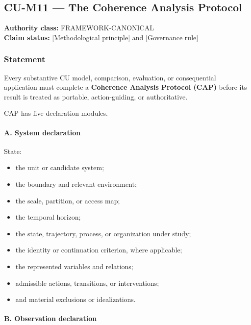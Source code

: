 \documentclass[
  11pt,
]{article}
\providecommand{\tightlist}{%
  \setlength{\itemsep}{0pt}\setlength{\parskip}{0pt}}
\begin{document}
\subsection{CU-M11 --- The Coherence Analysis
Protocol}\label{cu-m11-the-coherence-analysis-protocol}

\textbf{Authority class:} FRAMEWORK-CANONICAL\\
\textbf{Claim status:} {[}Methodological principle{]} and {[}Governance
rule{]}

\subsubsection{Statement}\label{statement-19}

Every substantive CU model, comparison, evaluation, or consequential
application must complete a \textbf{Coherence Analysis Protocol (CAP)}
before its result is treated as portable, action-guiding, or
authoritative.

CAP has five declaration modules.

\paragraph{A. System declaration}\label{a.-system-declaration}

State:

\begin{itemize}
\tightlist
\item
  the unit or candidate system;
\item
  the boundary and relevant environment;
\item
  the scale, partition, or access map;
\item
  the temporal horizon;
\item
  the state, trajectory, process, or organization under study;
\item
  the identity or continuation criterion, where applicable;
\item
  the represented variables and relations;
\item
  admissible actions, transitions, or interventions;
\item
  and material exclusions or idealizations.
\end{itemize}

\paragraph{B. Observation declaration}\label{b.-observation-declaration}
\end{document}
